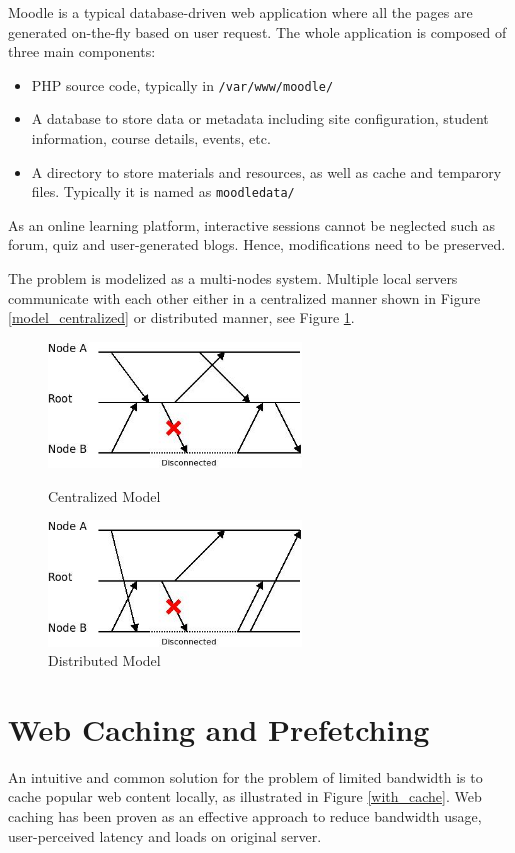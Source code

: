 Moodle is a typical database-driven web application where all the pages are generated on-the-fly based on user request. The whole application is composed of three main components: 
\begin{itemize}
\item PHP source code, typically in \texttt{/var/www/moodle/}
\item A database to store data or metadata including site configuration, student information, course details, events, etc.
\item A directory to store materials and resources, as well as cache and temparory files. Typically it is named as \texttt{moodledata/}
\end{itemize}

As an online learning platform, interactive sessions cannot be neglected such as forum, quiz and user-generated blogs. Hence, modifications need to be preserved.

The problem is modelized as a multi-nodes system. Multiple local servers communicate with each other either in a centralized manner shown in Figure \ref{model_centralized} or distributed manner, see Figure \ref{model_distributed}.
\begin{figure}[h]
\centering
\includegraphics[width=0.6\textwidth]{../images/model_centralized.jpeg}
\caption{Centralized Model}
\label{model_centralized}
\includegraphics[width=0.6\textwidth]{../images/model_distributed.jpeg}
\caption{Distributed Model}
\label{model_distributed}
\end{figure}



\section{Web Caching and Prefetching}
An intuitive and common solution for the problem of limited bandwidth is to cache popular web content locally, as illustrated in Figure \ref{with_cache}. Web caching has been proven as an effective approach to reduce bandwidth usage, user-perceived latency and loads on original server\cite{davison2001web}.


